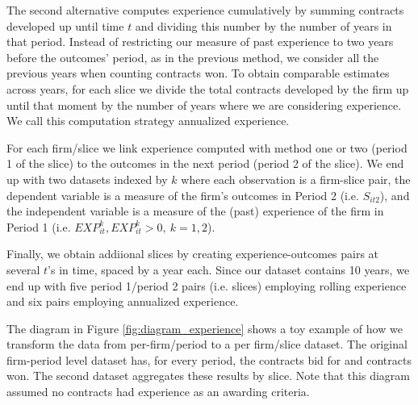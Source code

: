 The second alternative computes experience cumulatively by summing contracts developed up until time $t$ and dividing this number by the number of years in that period. Instead of restricting our measure of past experience to two years before the outcomes' period, as in the previous method, we consider all the previous years when counting contracts won. To obtain comparable estimates across years, for each slice we divide the total contracts developed by the firm up until that moment by the number of years where we are considering experience. We call this computation strategy annualized experience.

For each firm/slice we link experience computed with method one or two (period 1 of the slice) to the outcomes in the next period (period 2 of the slice). We end up with two datasets indexed by $k$ where each observation is a firm-slice pair, the dependent variable is a measure of the firm’s outcomes in Period 2 (i.e. $S_{it2}$), and the independent variable is a measure of the (past) experience of the firm in Period 1 (i.e. $EXP^k_{it}, EXP^k_{it}>0,\ k=1,2$).

Finally, we obtain addiional slices by creating experience-outcomes pairs at several $t$'s in time, spaced by a year each. Since our dataset contains 10 years, we end up with five period 1/period 2 pairs (i.e. slices) employing rolling experience and six pairs employing annualized experience.


The diagram in Figure \ref{fig:diagram_experience} shows a toy example of how we transform the data from per-firm/period to a per firm/slice dataset. The original firm-period level dataset has, for every period, the contracts bid for and contracts won. The second dataset aggregates these results by slice. Note that this diagram assumed no contracts had experience as an awarding criteria. %


